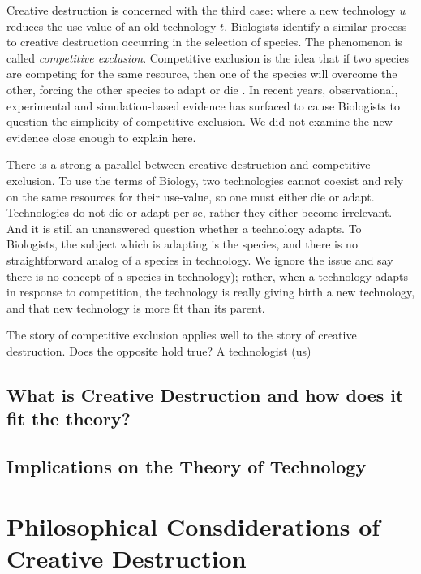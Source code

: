 \documentclass[11pt]{article}
\begin{document}
Creative destruction is concerned with the third case: where a new technology $u$ reduces the use-value of an old technology $t$. 
Biologists identify a similar process to creative destruction occurring in the selection of species. 
The phenomenon is called \textit{competitive exclusion}. 
Competitive exclusion is the idea that if two species are competing for the same resource, then one of the species will overcome the other, forcing the other species to adapt or die \cite{wiki-competitive-exclusion}. 
In recent years, observational, experimental and simulation-based evidence has surfaced to cause Biologists to question the simplicity of competitive exclusion.
We did not examine the new evidence close enough to explain here.

There is a strong a parallel between creative destruction and competitive exclusion.
To use the terms of Biology, two technologies cannot coexist and rely on the same resources for their use-value, so one must either die or adapt. 
Technologies do not die or adapt per se, rather they either become irrelevant.
And it is still an unanswered question whether a technology adapts. 
To Biologists, the subject which is adapting is the species, and there is no straightforward analog of a species in technology. 
We ignore the issue and say there is no concept of a species in technology); rather, when a technology adapts in response to competition, the technology is really giving birth a new technology, and that new technology is more fit than its parent.

The story of competitive exclusion applies well to the story of creative destruction.
Does the opposite hold true?
A technologist (us)





\subsection{What is Creative Destruction and how does it fit the theory?}
\subsection{Implications on the Theory of Technology}
\section{Philosophical Consdiderations of Creative Destruction}
\end{document}
